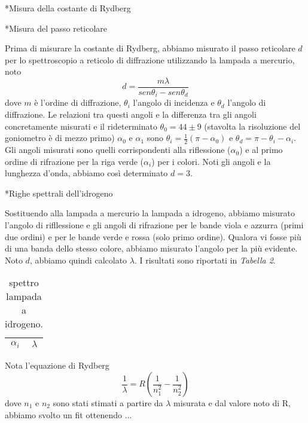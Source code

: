 \begin{section}*{Misura della costante di Rydberg}

\begin{subsection}*{Misura del passo reticolare}

Prima di misurare la costante di Rydberg, abbiamo misurato il passo reticolare $d$ per lo spettroscopio a reticolo di diffrazione utilizzando la lampada a mercurio, noto $$d = \frac{m\lambda}{sen\theta_{i} - sen\theta_{d}}$$ dove $m$ è l'ordine di diffrazione, $\theta_{i}$ l'angolo di incidenza e $\theta_{d}$ l'angolo di diffrazione. Le relazioni tra questi angoli e la differenza tra gli angoli concretamente misurati e il rideterminato $\theta_{0} = 44 \pm 9$ (stavolta la risoluzione del goniometro è di mezzo primo) $\alpha_{0}$ e $\alpha_{1}$ sono $\theta_{i} = \frac{1}{2} (\pi - \alpha_{0})$ e $\theta_{d} = \pi - \theta_{i} - \alpha_{i}$.\\  Gli angoli misurati sono quelli corrispondenti alla riflessione ($\alpha_{0}$) e al primo ordine di rifrazione per la riga verde ($\alpha_{i}$) per i colori. Noti gli angoli e la lunghezza d'onda, abbiamo così determinato $d = 3$.

\end{subsection}

\begin{subsection}*{Righe spettrali dell'idrogeno}

Sostituendo alla lampada a mercurio la lampada a idrogeno, abbiamo misurato l'angolo di rifllessione e gli angoli di rifrazione per le bande viola e azzurra (primi due ordini) e per le bande verde e rossa (solo primo ordine). Qualora vi fosse più di una banda dello stesso colore, abbiamo misurato l'angolo per la più evidente. Noto $d$, abbiamo quindi calcolato $\lambda$. I risultati sono riportati in \emph{Tabella 2}.\\

\begin{table}[h]
\begin{center}
\begin{tabular}{| r @{$\pm$} l  @{ Rad } | r @{$\pm$} l  @{\quad nm } |}

\hline
\multicolumn{2}{c|}{$\alpha_{i}$} & \multicolumn{2}{c|}{$\lambda$} \\
\hline

\hline

\end{tabular}
\caption{spettro lampada a idrogeno.}
\end{center}
\end{table}

Nota l'equazione di Rydberg $$ \frac{1}{\lambda} = R (\frac{1}{n_{1}^2} - \frac{1}{n_{2}^2}) $$ dove $n_1$ e $n_2$ sono stati stimati a partire da $\lambda$ misurata e dal valore noto di R, abbiamo svolto un fit ottenendo ...\\

\end{subsection}


\end{section}





